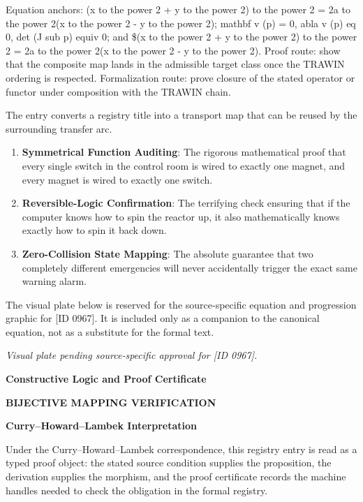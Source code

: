 Equation anchors: (x to the power 2 + y to the power 2) to the power 2 = 2a to the power 2(x to the power 2 - y to the power 2); mathbf v (p) = 0, abla v (p) eq 0, det (J sub p) equiv 0; and \$(x to the power 2 + y to the power 2) to the power 2 = 2a to the power 2(x to the power 2 - y to the power 2). Proof route: show that the composite map lands in the admissible target class once the TRAWIN ordering is respected. Formalization route: prove closure of the stated operator or functor under composition with the TRAWIN chain.

The entry converts a registry title into a transport map that can be reused by the surrounding transfer arc.
\endgroup

\begin{enumerate}[leftmargin=1.6em,itemsep=6pt,topsep=4pt]
\item \textbf{Symmetrical Function Auditing}: The rigorous mathematical proof that every single switch in the control room is wired to exactly one magnet, and every magnet is wired to exactly one switch.
\item \textbf{Reversible-Logic Confirmation}: The terrifying check ensuring that if the computer knows how to spin the reactor up, it also mathematically knows exactly how to spin it back down.
\item \textbf{Zero-Collision State Mapping}: The absolute guarantee that two completely different emergencies will never accidentally trigger the exact same warning alarm.
\end{enumerate}

\begingroup\footnotesize\sloppy
The visual plate below is reserved for the source-specific equation and progression graphic for [ID 0967]. It is included only as a companion to the canonical equation, not as a substitute for the formal text.
\par\endgroup
\begingroup\footnotesize\itshape
Visual plate pending source-specific approval for [ID 0967].
\par\endgroup

\clearpage
\begingroup\tzpsupportsetup
\noindent\textbf{\fontsize{10.8pt}{12.8pt}\selectfont [ID 0967] Constructive Logic and Proof Certificate}\par
\noindent\textbf{\fontsize{10pt}{12pt}\selectfont BIJECTIVE MAPPING VERIFICATION}\par
\vspace{0.45em}
\begingroup
\footnotesize
\setlength{\parskip}{0.22em}
\setlength{\parindent}{0pt}
\noindent\textbf{Curry--Howard--Lambek Interpretation}\par
Under the Curry--Howard--Lambek correspondence, this registry entry is read as a typed proof
object: the stated source condition supplies the proposition, the derivation supplies the
morphism, and the proof certificate records the machine handles needed to check the obligation
in the formal registry.

